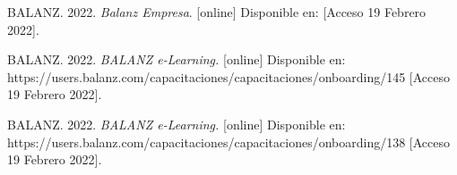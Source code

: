 %

%

\begin{flushleft}
\begin{thebibliography}{9}

BALANZ. 2022. \textit{Balanz Empresa}. [online] Disponible en:  [Acceso 19 Febrero 2022].

BALANZ. 2022. \textit{BALANZ e-Learning.} [online] Disponible en: https://users.balanz.com/capacitaciones/capacitaciones/onboarding/145 [Acceso 19 Febrero 2022].

BALANZ. 2022. \textit{BALANZ e-Learning.} [online] Disponible en: https://users.balanz.com/capacitaciones/capacitaciones/onboarding/138 [Acceso 19 Febrero 2022].

\end{thebibliography}
\end{flushleft}

%
